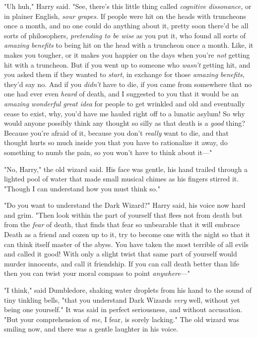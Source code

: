 "Uh huh," Harry said. "See, there's this little thing called \emph{cognitive
dissonance,} or in plainer English, \emph{sour grapes.} If people were hit on
the heads with truncheons once a month, and no one could do anything about it,
pretty soon there'd be all sorts of philosophers, \emph{pretending to be wise}
as you put it, who found all sorts of \emph{amazing benefits} to being hit on
the head with a truncheon once a month. Like, it makes you tougher, or it makes
you happier on the days when you're \emph{not} getting hit with a truncheon.
But if you went up to someone who \emph{wasn't} getting hit, and you asked them
if they wanted to \emph{start}, in exchange for those \emph{amazing benefits,}
they'd say no. And if you \emph{didn't} have to die, if you came from somewhere
that no one had ever even \emph{heard} of death, and I suggested to you that it
would be an \emph{amazing wonderful great idea} for people to get wrinkled and
old and eventually cease to exist, why, you'd have me hauled right off to a
lunatic asylum! So why would anyone possibly think any thought so silly as that
death is a \emph{good} thing? Because you're afraid of it, because you don't
\emph{really} want to die, and that thought hurts so much inside you that you
have to rationalize it away, do something to numb the pain, so you won't have
to think about it—"

"No, Harry," the old wizard said. His face was gentle, his hand trailed through
a lighted pool of water that made small musical chimes as his fingers stirred
it. "Though I can understand how you must think so."

"Do you want to understand the Dark Wizard?" Harry said, his voice now hard and
grim. "Then look within the part of yourself that flees not from death but from
the \emph{fear} of death, that finds that fear so unbearable that it will
embrace Death as a friend and cozen up to it, try to become one with the night
so that it can think itself master of the abyss. You have taken the most
terrible of all evils and called it good! With only a slight twist that same
part of yourself would murder innocents, and call it friendship. If you can
call death better than life then you can twist your moral compass to point
\emph{anywhere}—"

"I think," said Dumbledore, shaking water droplets from his hand to the sound
of tiny tinkling bells, "that you understand Dark Wizards \emph{very} well,
without yet being one yourself." It was said in perfect seriousness, and
without accusation. "But your comprehension of \emph{me}, I fear, is sorely
lacking." The old wizard was smiling now, and there was a gentle laughter in
his voice.

